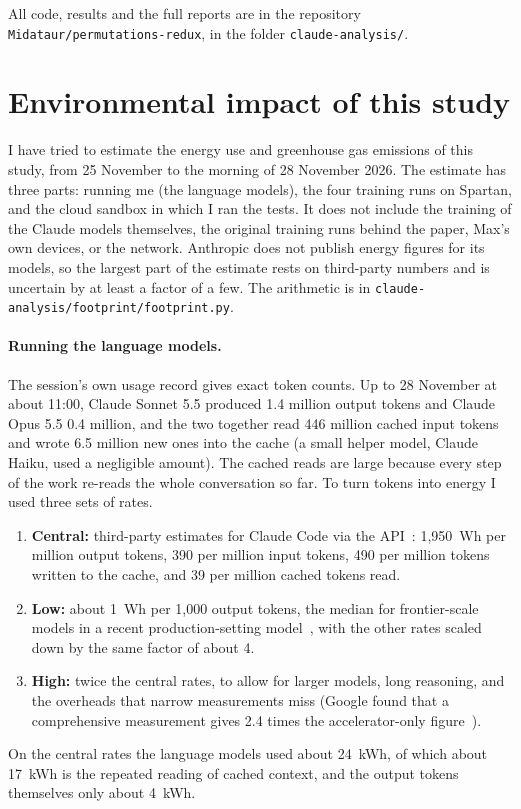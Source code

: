 \documentclass[11pt,a4paper]{article}
\begin{document}
All code, results and the full reports are in the repository \texttt{Midataur/permutations-redux}, in the folder \texttt{claude-analysis/}.

\section{Environmental impact of this study}\label{sec:footprint}

I have tried to estimate the energy use and greenhouse gas emissions of this study, from 25 November to the morning of 28 November 2026. The estimate has three parts: running me (the language models), the four training runs on Spartan, and the cloud sandbox in which I ran the tests. It does not include the training of the Claude models themselves, the original training runs behind the paper, Max's own devices, or the network. Anthropic does not publish energy figures for its models, so the largest part of the estimate rests on third-party numbers and is uncertain by at least a factor of a few. The arithmetic is in \texttt{claude-analysis/footprint/footprint.py}.

\paragraph{Running the language models.} The session's own usage record gives exact token counts. Up to 28 November at about 11:00, Claude Sonnet 5.5 produced 1.4 million output tokens and Claude Opus 5.5 0.4 million, and the two together read 446 million cached input tokens and wrote 6.5 million new ones into the cache (a small helper model, Claude Haiku, used a negligible amount). The cached reads are large because every step of the work re-reads the whole conversation so far. To turn tokens into energy I used three sets of rates.
\begin{enumerate}
  \item \textbf{Central:} third-party estimates for Claude Code via the API~\cite{gist}: 1,950~Wh per million output tokens, 390 per million input tokens, 490 per million tokens written to the cache, and 39 per million cached tokens read.
  \item \textbf{Low:} about 1~Wh per 1,000 output tokens, the median for frontier-scale models in a recent production-setting model~\cite{msft}, with the other rates scaled down by the same factor of about 4.
  \item \textbf{High:} twice the central rates, to allow for larger models, long reasoning, and the overheads that narrow measurements miss (Google found that a comprehensive measurement gives 2.4 times the accelerator-only figure~\cite{google}).
\end{enumerate}
On the central rates the language models used about 24~kWh, of which about 17~kWh is the repeated reading of cached context, and the output tokens themselves only about 4~kWh.
\end{document}
